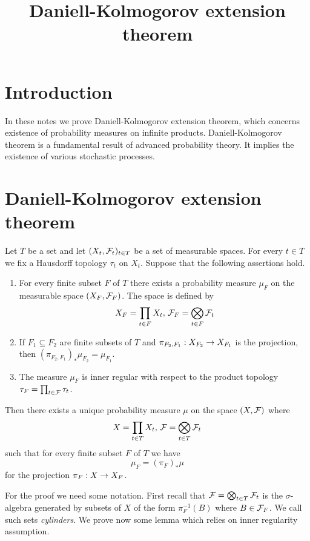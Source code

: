 



\title{Daniell-Kolmogorov extension theorem}
\date{}
\maketitle

\section{Introduction}
\noindent
In these notes we prove Daniell-Kolmogorov extension theorem, which concerns existence of probability measures on infinite products. Daniell-Kolmogorov theorem is a fundamental result of advanced probability theory. It implies the existence of various stochastic processes.

\section{Daniell-Kolmogorov extension theorem}

\begin{theorem}\label{theorem:Daniell_Kolmogorov_extension}
Let $T$ be a set and let $(X_t,{\mathcal F}_t)_{t\in T}$ be a set of measurable spaces. For every $t\in T$ we fix a Hausdorff topology $\tau_t$ on $X_t$. Suppose that the following assertions hold.
\begin{enumerate}[label=\emph{\textbf{(\arabic*)}}, leftmargin=*]
\item For every finite subset $F$ of $T$ there exists a probability measure $\mu_F$ on the measurable space $(X_F,{\mathcal F}_F)$. The space is defined by
$$X_F = \prod_{t\in F}X_t,\,{\mathcal F}_F = \bigotimes_{t\in F}{\mathcal F}_t$$
\item If $F_1\subseteq F_2$ are finite subsets of $T$ and $\pi_{F_2,F_1}:X_{F_2}\rightarrow X_{F_1}$ is the projection, then $\left(\pi_{F_2,F_1}\right)_*\mu_{F_2} = \mu_{F_1}$.
\item The measure $\mu_F$ is inner regular with respect to the product topology $\tau_F = \prod_{t\in {\mathcal F}}\tau_t$.
\end{enumerate}
Then there exists a unique probability measure $\mu$ on the space $(X,{\mathcal F})$ where 
$$X = \prod_{t\in T}X_t,\,{\mathcal F} = \bigotimes_{t\in T}{\mathcal F}_t$$
such that for every finite subset $F$ of $T$ we have
$$\mu_F = \left(\pi_F\right)_*\mu$$
for the projection $\pi_F:X\rightarrow X_F$.
\end{theorem}
\noindent
For the proof we need some notation. First recall that ${\mathcal F} = \bigotimes_{t\in T}{\mathcal F}_t$ is the $\sigma$-algebra generated by subsets of $X$ of the form $\pi_F^{-1}(B)$ where $B\in {\mathcal F}_F$. We call such sets \textit{cylinders}. We prove now some lemma which relies on inner regularity assumption.

